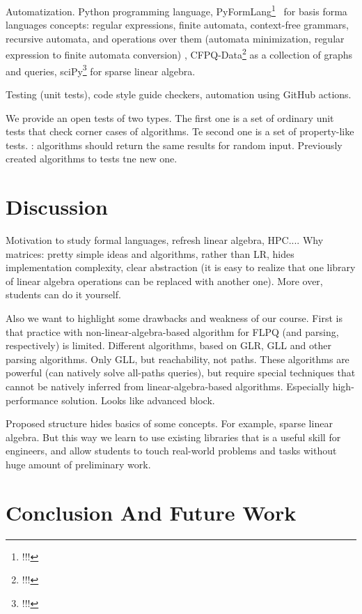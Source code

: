 \documentclass[sigconf]{acmart}
\begin{document}
Automatization. 
Python programming language, PyFormLang\footnote{!!!}~\cite{10.1145/3408877.3432464} for basis forma languages concepts: regular expressions, finite automata, context-free grammars, recursive automata, and operations over them (automata minimization, regular expression to finite automata conversion) , CFPQ-Data\footnote{!!!} as a collection of graphs and queries, sciPy\footnote{!!!} for sparse linear algebra.

Testing (unit tests), code style guide checkers, automation using GitHub actions.

We provide an open tests of two types.
The first one is a set of ordinary unit tests that check corner cases of algorithms.
Te second one is a set of property-like tests. : algorithms should return the same results for random input.
Previously created algorithms to tests tne new one.


\section{Discussion}

Motivation to study formal languages, refresh linear algebra, HPC....
Why matrices: pretty simple ideas and algorithms, rather than LR, hides implementation complexity, clear abstraction (it is easy to realize that one library of linear algebra operations can be replaced with another one). More over, students can do it yourself.

Also we want to highlight some drawbacks and weakness of our course.
First is that practice with non-linear-algebra-based algorithm for FLPQ (and parsing, respectively) is limited. 
Different algorithms, based on GLR, GLL and other parsing algorithms. 
Only GLL, but reachability, not paths.
These algorithms are powerful (can natively solve all-paths queries), but require special techniques that cannot be natively inferred from linear-algebra-based algorithms.
Especially high-performance solution.
Looks like advanced block. 

Proposed structure hides basics of some concepts. 
For example, sparse linear algebra.
But this way we learn to use existing libraries that is a useful skill for engineers, and allow students to touch real-world problems and tasks without huge amount of preliminary work.

\section{Conclusion And Future Work}
\end{document}
